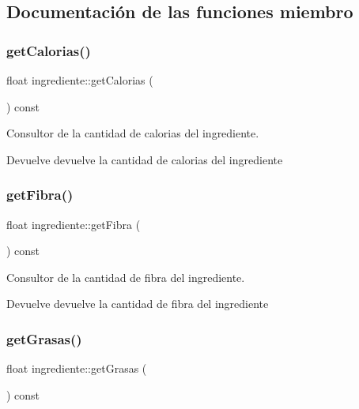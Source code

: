 \subsection{Documentación de las funciones miembro}
\mbox{\label{classingrediente_ad22b8aa7d67351699d9e208de0b7d896}} 
\subsubsection{\texorpdfstring{get\+Calorias()}{getCalorias()}}
{\footnotesize\ttfamily float ingrediente\+::get\+Calorias (\begin{DoxyParamCaption}{ }\end{DoxyParamCaption}) const}



Consultor de la cantidad de calorias del ingrediente. 

\begin{DoxyReturn}{Devuelve}
devuelve la cantidad de calorias del ingrediente 
\end{DoxyReturn}
\mbox{\label{classingrediente_ad33a9651f19a39c8157dbd7d63c69cdb}} 
\subsubsection{\texorpdfstring{get\+Fibra()}{getFibra()}}
{\footnotesize\ttfamily float ingrediente\+::get\+Fibra (\begin{DoxyParamCaption}{ }\end{DoxyParamCaption}) const}



Consultor de la cantidad de fibra del ingrediente. 

\begin{DoxyReturn}{Devuelve}
devuelve la cantidad de fibra del ingrediente 
\end{DoxyReturn}
\mbox{\label{classingrediente_a6250c0751a2e5bc5adeb0c9de7f209e7}} 
\subsubsection{\texorpdfstring{get\+Grasas()}{getGrasas()}}
{\footnotesize\ttfamily float ingrediente\+::get\+Grasas (\begin{DoxyParamCaption}{ }\end{DoxyParamCaption}) const}



